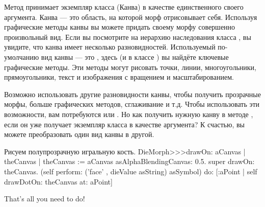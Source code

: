 \documentclass[a4paper,10pt,twoside]{book}
\begin{document}
Метод  принимает экземпляр класса  (Канва) в качестве единственного своего аргумента.
Канва --- это область, на которой морф отрисовывает себя.
Используя графические методы канвы вы можете придать своему морфу совершенно произвольный вид.
Если вы посмотрите на иерархию наследования класса , вы увидите, что канва имеет несколько разновидностей.
Используемый по-умолчанию вид канвы --- это , здесь (и в классе ) вы найдёте ключевые графические методы.
Эти методы могут рисовать точки, линии, многоугольники, прямоугольники, текст и изображения с вращением и масштабированием.

Возможно использовать другие разновидности канвы, чтобы получить прозрачные морфы, больше графических методов, сглаживание и т.д.
Чтобы использовать эти возможности, вам потребуются  или .
Но как получить нужную канву в методе , если он уже получает экземпляр класса  в качестве аргумента?
К счастью, вы можете преобразовать один вид канвы в другой.

\begin{method}{Рисуем полупрозрачную игральную кость.}
DieMorph>>>drawOn: aCanvas
	| theCanvas |
	theCanvas := aCanvas asAlphaBlendingCanvas: 0.5.
	super drawOn: theCanvas.
	(self perform: ('face' , dieValue asString) asSymbol)
		do: [:aPoint | self drawDotOn: theCanvas at: aPoint]
\end{method}
\noindent
That's all you need to do!
\end{document}
